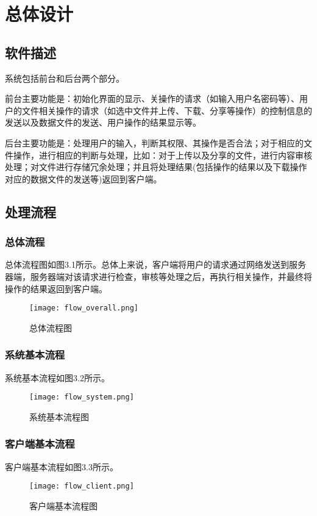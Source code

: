 \chapter{总体设计}
\section{软件描述}
系统包括前台和后台两个部分。

前台主要功能是：初始化界面的显示、关操作的请求（如输入用户名密码等）、用户的文件相关操作的请求（如选中文件并上传、下载、分享等操作）的控制信息的发送以及数据文件的发送、用户操作的结果显示等。

后台主要功能是：处理用户的输入，判断其权限、其操作是否合法；对于相应的文件操作，进行相应的判断与处理，比如：对于上传以及分享的文件，进行内容审核处理；对文件进行存储冗余处理；并且将处理结果(包括操作的结果以及下载操作对应的数据文件的发送等)返回到客户端。

\section{处理流程}
\subsection{总体流程}
总体流程图如图3.1所示。总体上来说，客户端将用户的请求通过网络发送到服务器端，服务器端对该请求进行检查，审核等处理之后，再执行相关操作，并最终将操作的结果返回到客户端。
\begin{figure}[!ht] 
\centering
\texttt{[image: flow\_overall.png]} 
\caption{总体流程图}\label{fig:noted-figure}
\end{figure}

\subsection{系统基本流程} 
系统基本流程如图3.2所示。
\begin{figure}[!ht] 
\centering
\texttt{[image: flow\_system.png]}
\caption{系统基本流程图}\label{fig:noted-figure}
\end{figure} 


\subsection{客户端基本流程}
客户端基本流程如图3.3所示。
\begin{figure}[!ht] 
\centering
\texttt{[image: flow\_client.png]}
\caption{客户端基本流程图}\label{fig:noted-figure}
\end{figure}

